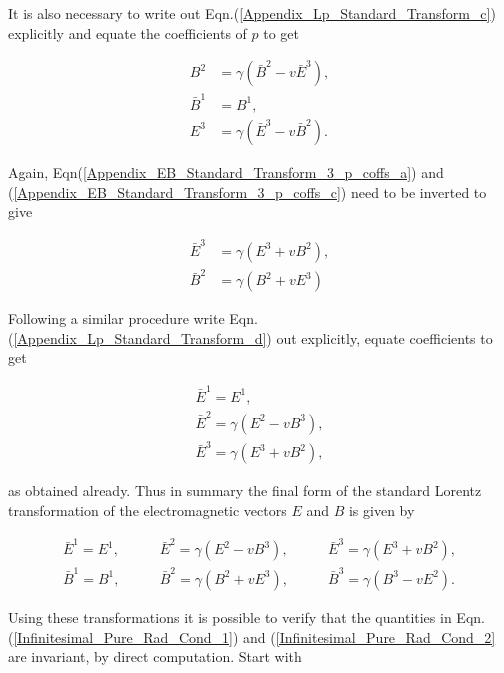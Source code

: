\begin{appendix}
\noindent It is also necessary to write out Eqn.(\ref{Appendix_Lp_Standard_Transform_c}) explicitly and equate the coefficients of $p$ to get

\begin{align}
\label{Appendix_EB_Standard_Transform_3_p_coffs_a}
B^2 & = \gamma (\bar{B}^2 - v\bar{E}^3),
\\\label{Appendix_EB_Standard_Transform_3_p_coffs_b}
\bar{B}^1 & = {B}^1,
\\\label{Appendix_EB_Standard_Transform_3_p_coffs_c}
E^3 & = \gamma(\bar{E}^3 - v\bar{B}^2).
\end{align}

\noindent Again, Eqn(\ref{Appendix_EB_Standard_Transform_3_p_coffs_a}) and (\ref{Appendix_EB_Standard_Transform_3_p_coffs_c}) need to be inverted to give

\begin{subequations}
\begin{align}
\label{Appendix_EB_Standard_Transform_3_p_coeffs_Inverted_a}
\bar{E}^3 & = \gamma (E^3 + vB^2),
\\\label{Appendix_EB_Standard_Transform_3_p_coeffs_Inverted_b}
\bar{B}^2 & = \gamma (B^2 + vE^3)
\end{align}
\end{subequations}

\noindent Following a similar procedure write Eqn.(\ref{Appendix_Lp_Standard_Transform_d}) out explicitly, equate coefficients to get

\begin{align*}
\bar{E}^1 = E^1,\\
\bar{E}^2 = \gamma (E^2 - vB^3),\\
\bar{E}^3 = \gamma (E^3 + vB^2),
\end{align*}

\noindent as obtained already. Thus in summary the final form of the standard Lorentz transformation of the electromagnetic vectors $E$ and $B$ is given by

\begin{align*}
\bar{E}^1 = E^1, \qquad & \bar{E}^2 = \gamma (E^2 - vB^3), \qquad & \bar{E}^3 = \gamma(E^3 + vB^2),\\
\bar{B}^1 = B^1, \qquad & \bar{B}^2 = \gamma (B^2 + vE^3), \qquad & \bar{B}^3 = \gamma (B^3 - vE^2). 
\end{align*}

\noindent Using these transformations it is possible to verify that the quantities in Eqn.(\ref{Infinitesimal_Pure_Rad_Cond_1}) and (\ref{Infinitesimal_Pure_Rad_Cond_2} are invariant, by direct computation. Start with


\end{appendix}
